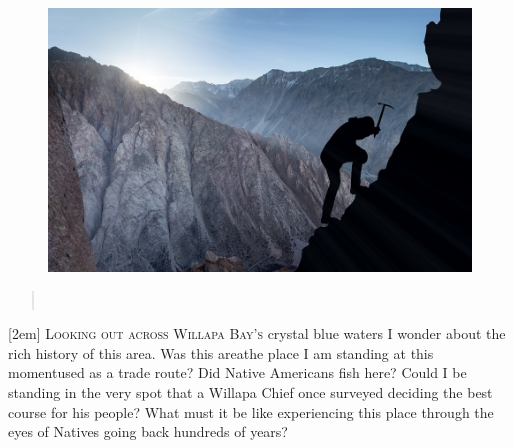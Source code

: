 \begin{figure}[h]                                                           
 \includegraphics[width=\linewidth]{./media/images/summit}%
  \label{fig:editorial}%
\end{figure}                                                                
\begin{quotation} 
\noindent{}\\[.5mm]

\hfill{}
\end{quotation} 
[2em]
\lettrine[lines=3]{\color{BrickRed}L}{\enspace ooking out across Willapa Bay's}
crystal blue waters I wonder about the rich history of this area. Was this
area\textemdash the place I am standing at this moment\textemdash used as a trade
route? Did Native Americans fish here? Could I be standing in the very spot
that a Willapa Chief once surveyed deciding the best course for his people? What
must it be like experiencing this place through the eyes of Natives going back
hundreds of years?

